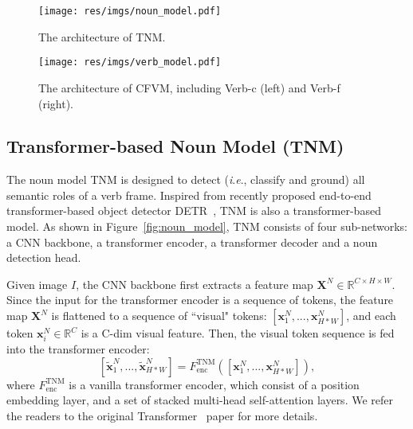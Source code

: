 \documentclass[letterpaper]{article} \usepackage{aaai22}  \usepackage{times}  \usepackage{helvet}  \usepackage{courier}  \usepackage[hyphens]{url}  \usepackage{graphicx} \urlstyle{rm} \def\UrlFont{\rm}  \usepackage{natbib}  \usepackage{caption} \DeclareCaptionStyle{ruled}{labelfont=normalfont,labelsep=colon,strut=off} \frenchspacing  \setlength{\pdfpagewidth}{8.5in}  \setlength{\pdfpageheight}{11in}
\newcommand{\ie}{\textit{i}.\textit{e}.}
\begin{document}
\begin{figure*}
    \begin{minipage}{\textwidth}
        \begin{minipage}[t]{0.36\textwidth}
            \centering
            \texttt{[image: res/imgs/noun\_model.pdf]}
            \caption{The architecture of TNM.}
            \label{fig:noun_model}
        \end{minipage}
        \begin{minipage}[t]{0.64\textwidth}
             \centering
            \texttt{[image: res/imgs/verb\_model.pdf]}
            \caption{The architecture of CFVM, including Verb-c (left) and Verb-f (right).}
            \label{fig:verb_model}
        \end{minipage}
    \end{minipage}
\end{figure*}



\subsection{Transformer-based Noun Model (TNM)}

The noun model TNM is designed to detect (\ie, classify and ground) all semantic roles of a verb frame. Inspired from recently proposed end-to-end transformer-based object detector DETR~\cite{carion2020end}, TNM is also a transformer-based model. As shown in Figure~\ref{fig:noun_model}, TNM consists of four sub-networks: a CNN backbone, a transformer encoder, a transformer decoder and a noun detection head.

Given image $I$, the CNN backbone first extracts a feature map $\bm{X}^N \in\mathbb{R}^{C \times {H} \times {W}}$. Since the input for the transformer encoder is a sequence of tokens, the feature map $\bm{X}^N$ is flattened to a sequence of ``visual" tokens: $[\bm{x}^N_1, ..., \bm{x}^N_{H*W}]$, and each token $\bm{x}^N_i \in \mathbb{R}^C$ is a C-dim visual feature. Then, the visual token sequence is fed into the transformer encoder:
\begin{equation}
    \left[ \tilde{\bm{x}}^N_1, ..., \tilde{\bm{x}}^N_{H*W} \right] = F^{\text{TNM}}_{\text{enc}} (\left[\bm{x}^N_1, ..., \bm{x}^N_{H*W} \right]),
\end{equation}
where $F^{\text{TNM}}_{\text{enc}}$ is a vanilla transformer encoder, which consist of a position embedding layer, and a set of stacked multi-head self-attention layers. We refer the readers to the original Transformer~\cite{vaswani2017attention} paper for more details.
\end{document}
